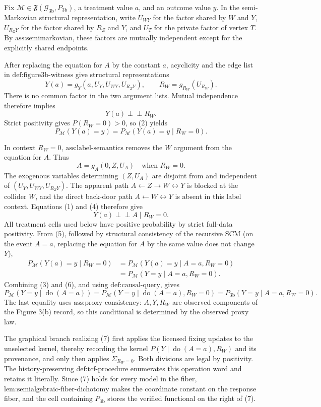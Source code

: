 Fix \(\mathcal M\in\mathfrak F(\mathcal G_{\mathrm{3b}},P_{\mathrm{3b}})\), a treatment value \(a\), and an outcome value \(y\). In the semi-Markovian structural representation, write \(U_{WY}\) for the factor shared by \(W\) and \(Y\), \(U_{R_ZY}\) for the factor shared by \(R_Z\) and \(Y\), and \(U_T\) for the private factor of vertex \(T\). By \(\text{ass:semimarkovian}\), these factors are mutually independent except for the explicitly shared endpoints.

After replacing the equation for \(A\) by the constant \(a\), acyclicity and the edge list in \(\text{def:figure3b-witness}\) give structural representations
\[
Y(a)=g_Y(a,U_Y,U_{WY},U_{R_ZY}),
\qquad
R_W=g_{R_W}(U_{R_W}).
\tag{1}
\]
There is no common factor in the two argument lists. Mutual independence therefore implies
\[
Y(a)\mathbin{\perp\!\!\!\perp}R_W.
\tag{2}
\]
Strict positivity gives \(P(R_W=0)>0\), so (2) yields
\[
P_{\mathcal M}(Y(a)=y)
=P_{\mathcal M}(Y(a)=y\mid R_W=0).
\tag{3}
\]

In context \(R_W=0\), \(\text{ass:label-semantics}\) removes the \(W\) argument from the equation for \(A\). Thus
\[
A=g_A(0,Z,U_A)\quad\text{when }R_W=0.
\tag{4}
\]
The exogenous variables determining \((Z,U_A)\) are disjoint from and independent of \((U_Y,U_{WY},U_{R_ZY})\). The apparent path \(A\leftarrow Z\to W\leftrightarrow Y\) is blocked at the collider \(W\), and the direct back-door path \(A\leftarrow W\leftrightarrow Y\) is absent in this label context. Equations (1) and (4) therefore give
\[
Y(a)\mathbin{\perp\!\!\!\perp}A\mid R_W=0.
\tag{5}
\]
All treatment cells used below have positive probability by strict full-data positivity. From (5), followed by structural consistency of the recursive SCM (on the event \(A=a\), replacing the equation for \(A\) by the same value does not change \(Y\)),
\[
\begin{aligned}
P_{\mathcal M}(Y(a)=y\mid R_W=0)
&=P_{\mathcal M}(Y(a)=y\mid A=a,R_W=0)\\
&=P_{\mathcal M}(Y=y\mid A=a,R_W=0).
\end{aligned}
\tag{6}
\]
Combining (3) and (6), and using \(\text{def:causal-query}\), gives
\[
P_{\mathcal M}(Y=y\mid\operatorname{do}(A=a))
=P_{\mathcal M}(Y=y\mid\operatorname{do}(A=a),R_W=0)
=P_{\mathrm{3b}}(Y=y\mid A=a,R_W=0).
\tag{7}
\]
The last equality uses \(\text{ass:proxy-consistency}\): \(A,Y,R_W\) are observed components of the Figure 3(b) record, so this conditional is determined by the observed proxy law.

The graphical branch realizing (7) first applies the licensed fixing updates to the unselected kernel, thereby recording the kernel \(P(Y\mid\operatorname{do}(A=a),R_W)\) and its provenance, and only then applies \(\Sigma_{R_W=0}\). Both divisions are legal by positivity. The history-preserving \(\text{def:tcf-procedure}\) enumerates this operation word and retains it literally. Since (7) holds for every model in the fiber, \(\text{lem:semialgebraic-fiber-dichotomy}\) makes the coordinate constant on the response fiber, and the cell containing \(P_{\mathrm{3b}}\) stores the verified functional on the right of (7).

